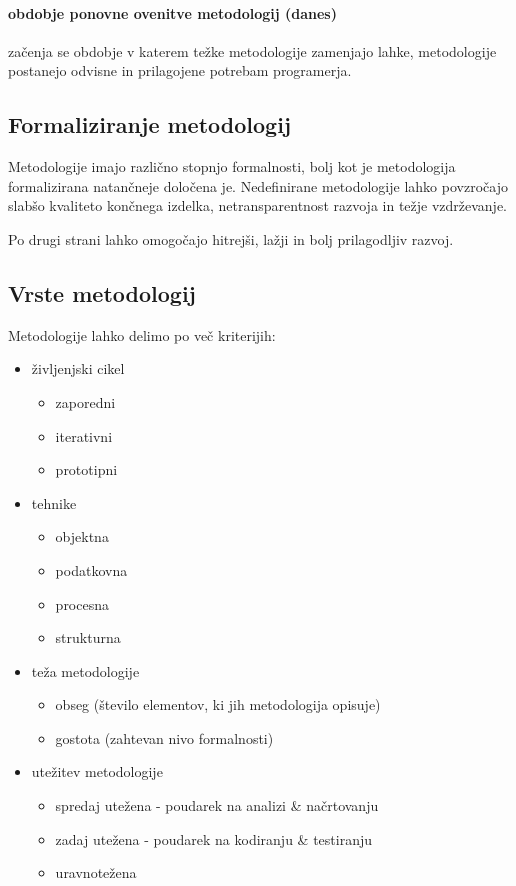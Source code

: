 \documentclass[a4paper,12pt]{report}
\begin{document}
   \paragraph{obdobje ponovne ovenitve metodologij (danes)} začenja se obdobje v katerem težke metodologije zamenjajo lahke, metodologije
   postanejo odvisne in prilagojene potrebam programerja.

   \pagebreak

   \subsection{Formaliziranje metodologij}
   Metodologije imajo različno stopnjo formalnosti, bolj kot je metodologija formalizirana natančneje določena je. 
   Nedefinirane metodologije lahko povzročajo slabšo kvaliteto končnega izdelka, netransparentnost razvoja in težje vzdrževanje.

   Po drugi strani lahko omogočajo hitrejši, lažji in bolj prilagodljiv razvoj.

   \subsection{Vrste metodologij}
   Metodologije lahko delimo po več kriterijih:
   \begin{itemize}
      \item življenjski cikel
         \begin{itemize}
            \item zaporedni
            \item iterativni
            \item prototipni
         \end{itemize}
      \item tehnike
         \begin{itemize}
            \item objektna
            \item podatkovna
            \item procesna
            \item strukturna
         \end{itemize}
      \item teža metodologije
      \begin{itemize}
         \item obseg (število elementov, ki jih metodologija opisuje)
         \item gostota (zahtevan nivo formalnosti)
      \end{itemize}
      \item utežitev metodologije
      \begin{itemize}
         \item spredaj utežena - poudarek na analizi \& načrtovanju
         \item zadaj utežena - poudarek na kodiranju \& testiranju
         \item uravnotežena
      \end{itemize}
   \end{itemize}
\end{document}
